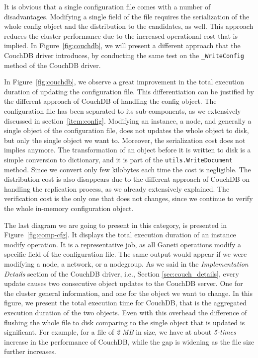 It is obvious that a single configuration file comes with a number of
disadvantages. Modifying a single field of the file requires the serialization
of the whole config object and the distribution to the candidates, as well. This
approach reduces the cluster performance due to the increased operational cost
that is implied. In Figure~\ref{fig:couchdb}, we will present a different
approach that the CouchDB driver introduces, by conducting the same test on the
\texttt{\_WriteConfig} method of the CouchDB driver.

In Figure~\ref{fig:couchdb}, we observe a great improvement in the total
execution duration of updating the configuration file. This differentiation can
be justified by the different approach of CouchDB of handling the config object.
The configuration file has been separated to its sub-components, as
we extensively discussed in section~\ref{item:config}. Modifying an instance, a
node, and generally a single object of the configuration file, does not updates
the whole object to disk, but only the single object we want to.
Moreover, the serialization cost does not
implies anymore. The transformation of an object before it is written to disk
is a simple conversion to dictionary, and it is part of the
\texttt{utils.WriteDocument} method. Since we convert only few kilobytes each
time the cost is negligible. The distribution cost is also disappears due to
the different approach of CouchDB on handling the replication process, as we
already extensively explained. The verification cost is the only one that does
not changes, since we continue to verify the whole in-memory configuration
object.

The last diagram we are going to present in this category, is presented in
Figure~\ref{fig:comp-cfg}. It displays the total execution duration of an
instance modify operation. It is a representative job, as all Ganeti operations
modify a specific field of the configuration file. The same output would appear
if we were modifying a node, a network, or a nodegroup. As we said in the
\emph{Implementation Details} section of the CouchDB driver, i.e., Section
\ref{sec:couch_details}, every update causes two consecutive object updates to
the CouchDB server. One for the cluster general information, and one for the
object we want to change. In this figure, we present the total execution time
for CouchDB, that is the aggregated execution duration of the two objects.
Even with this overhead the difference of flushing the whole file to disk
comparing to the single object that is updated is significant. For example, for
a file of \emph{2 MB} in size, we have at about \emph{5-times} increase in the
performance of CouchDB, while the gap is widening as the file size further
increases.

